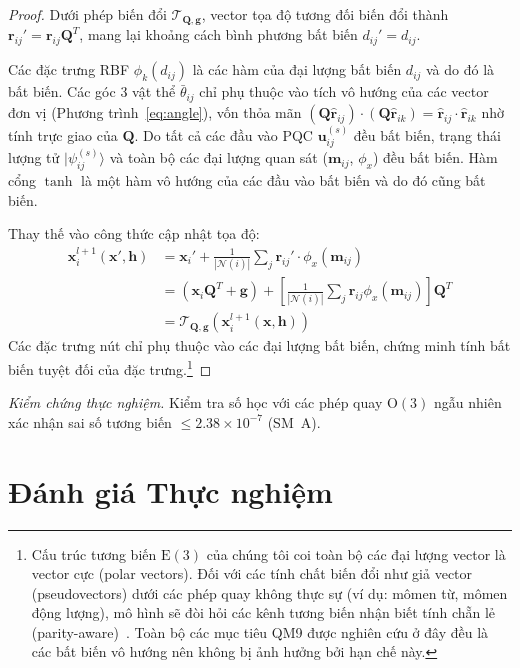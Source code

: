 \documentclass[10pt,twocolumn,letterpaper]{article}
\begin{document}
\begin{proof}
Dưới phép biến đổi $\mathcal{T}_{\mathbf{Q}, \mathbf{g}}$, vector tọa độ tương đối biến đổi thành $\mathbf{r}_{ij}' = \mathbf{r}_{ij}\mathbf{Q}^T$, mang lại khoảng cách bình phương bất biến $d_{ij}' = d_{ij}$.

Các đặc trưng RBF $\phi_k(d_{ij})$ là các hàm của đại lượng bất biến $d_{ij}$ và do đó là bất biến. Các góc 3 vật thể $\bar{\theta}_{ij}$ chỉ phụ thuộc vào tích vô hướng của các vector đơn vị (Phương trình~\ref{eq:angle}), vốn thỏa mãn $(\mathbf{Q}\hat{\mathbf{r}}_{ij}) \cdot (\mathbf{Q}\hat{\mathbf{r}}_{ik}) = \hat{\mathbf{r}}_{ij} \cdot \hat{\mathbf{r}}_{ik}$ nhờ tính trực giao của $\mathbf{Q}$. Do tất cả các đầu vào PQC $\mathbf{u}_{ij}^{(s)}$ đều bất biến, trạng thái lượng tử $|\psi_{ij}^{(s)}\rangle$ và toàn bộ các đại lượng quan sát ($\mathbf{m}_{ij}$, $\phi_x$) đều bất biến. Hàm cổng $\tanh$ là một hàm vô hướng của các đầu vào bất biến và do đó cũng bất biến.

Thay thế vào công thức cập nhật tọa độ:
\begin{align}
    \mathbf{x}_i^{l+1}(\mathbf{x}', \mathbf{h}) &= \mathbf{x}_i' + \frac{1}{|\mathcal{N}(i)|} \sum_{j} \mathbf{r}_{ij}' \cdot \phi_x(\mathbf{m}_{ij}) \nonumber \\
    &= (\mathbf{x}_i \mathbf{Q}^T + \mathbf{g}) + \left[\frac{1}{|\mathcal{N}(i)|} \sum_{j} \mathbf{r}_{ij} \phi_x(\mathbf{m}_{ij})\right] \mathbf{Q}^T \nonumber \\
    &= \mathcal{T}_{\mathbf{Q}, \mathbf{g}}(\mathbf{x}_i^{l+1}(\mathbf{x}, \mathbf{h}))
\end{align}
Các đặc trưng nút chỉ phụ thuộc vào các đại lượng bất biến, chứng minh tính bất biến tuyệt đối của đặc trưng.\footnote{Cấu trúc tương biến $\mathrm{E}(3)$ của chúng tôi coi toàn bộ các đại lượng vector là vector cực (polar vectors). Đối với các tính chất biến đổi như giả vector (pseudovectors) dưới các phép quay không thực sự (ví dụ: mômen từ, mômen động lượng), mô hình sẽ đòi hỏi các kênh tương biến nhận biết tính chẵn lẻ (parity-aware)~\cite{batatiaMACEHigherOrder2022}. Toàn bộ các mục tiêu QM9 được nghiên cứu ở đây đều là các bất biến vô hướng nên không bị ảnh hưởng bởi hạn chế này.}
\end{proof}

\noindent\textit{Kiểm chứng thực nghiệm.} Kiểm tra số học với các phép quay $\mathrm{O}(3)$ ngẫu nhiên xác nhận sai số tương biến $\le 2.38 \times 10^{-7}$ (SM~A).

\section{Đánh giá Thực nghiệm}
\label{sec:experiments}
\end{document}

